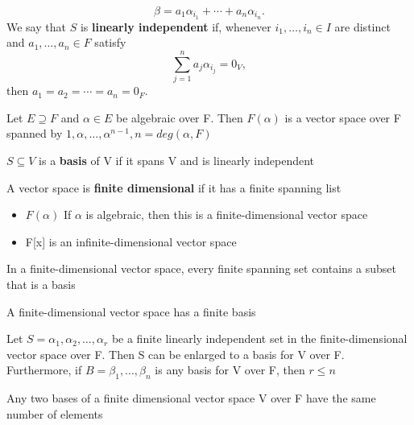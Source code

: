 \documentclass[main.tex]{subfiles}
\begin{document}
\[
    \beta = a_1\alpha_{i_1} + \cdots + a_n\alpha_{i_n}.
\]
We say that $S$ is \textbf{linearly independent} if, whenever
$i_1,\ldots,i_n \in I$ are distinct and $a_1,\ldots,a_n \in F$ satisfy
\[
\sum_{j=1}^{n} a_j\alpha_{i_j} = 0_V,
\]
then $a_1 = a_2 = \cdots = a_n = 0_F$.

\begin{example}
    Let $E \supseteq F$ and $\alpha \in E$ be algebraic over F. Then $F(\alpha)$ is a vector space over F spanned by $1, \alpha, \ldots, \alpha^{n-1}, n=deg(\alpha,F)$
\end{example}
\begin{definition}
    $S \subseteq V $ is a \textbf{basis} of V if it spans V and is linearly independent
\end{definition}
\begin{definition}
    A vector space is \textbf{finite dimensional} if it has a finite spanning list
\end{definition}
\begin{example}\leavevmode
    \begin{itemize}
        \item $F(\alpha)$ If $\alpha$ is algebraic, then this is a finite-dimensional vector space
        \item F[x] is an infinite-dimensional vector space
    \end{itemize}
\end{example}
\begin{theorem}
    In a finite-dimensional vector space, every finite spanning set contains a subset that is a basis
\end{theorem}
\begin{corollary}
    A finite-dimensional vector space has a finite basis
\end{corollary}
\begin{theorem}
    Let $S = {\alpha_1, \alpha_2, \dots, \alpha_r}$ be a finite linearly independent set in the finite-dimensional vector space over F. Then S can be enlarged to a basis for V over F. Furthermore, if $B = {\beta_1, \dots, \beta_n}$ is any basis for V over F, then $r \leq n$
\end{theorem}
\begin{corollary}
    Any two bases of a finite dimensional vector space V over F have the same number of elements
\end{corollary}
\end{document}
